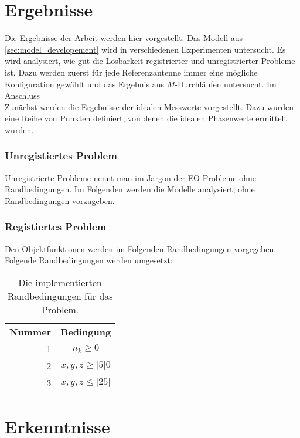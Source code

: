 \section{Ergebnisse}
%
Die Ergebnisse der Arbeit werden hier vorgestellt. Das Modell aus \ref{sec:model_developement} wird in verschiedenen Experimenten untersucht.%
Es wird analysiert, wie gut die Lösbarkeit registrierter und unregistrierter Probleme ist. Dazu werden zuerst für jede Referenzantenne immer eine mögliche Konfiguration gewählt und das Ergebnis aus $M$-Durchläufen untersucht. Im Anschluss %
\\
Zunächst werden die Ergebnisse der idealen Messwerte vorgestellt. Dazu wurden eine Reihe von Punkten definiert, von denen die idealen Phasenwerte ermittelt wurden.
%
\subsubsection{Unregistiertes Problem}
%
Unregistrierte Probleme nennt man im Jargon der EO Probleme ohne Randbedingungen. Im Folgenden werden die Modelle analysiert, ohne Randbedingungen vorzugeben. 
%
\subsubsection{Registiertes Problem}
%
Den Objektfunktionen werden im Folgenden Randbedingungen vorgegeben. Folgende Randbedingungen werden umgesetzt:
%
\begin{table} [ht!]
	\begin{center}
		\begin{tabular}{rc}
			\textbf{Nummer} & \textbf{Bedingung} \\
			1 & $n_k\ge0$ \\
			2 & $x,y,z \ge |5|0$\\
			3 & $x,y,z \le |25|$\\
%			
		\end{tabular}
	\end{center}
	\caption[Randbedingungen für Optimierung]{Die implementierten Randbedingungen für das Problem.}
	\label{tab:registrations}
\end{table}
%
\section{Erkenntnisse}
%
\lipsum[1-10]